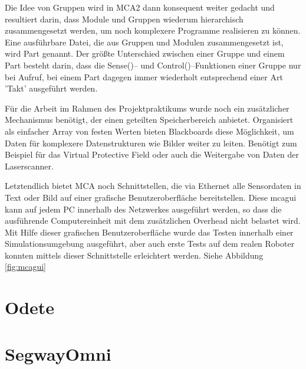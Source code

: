 Die Idee von Gruppen wird in MCA2 dann konsequent weiter gedacht und resultiert darin,
 dass Module und Gruppen wiederum hierarchisch zusammengesetzt werden, um noch komplexere Programme realisieren zu können.
 Eine ausführbare Datei, die aus Gruppen und Modulen zusammengesetzt ist, wird Part genannt.
 Der größte Unterschied zwischen einer Gruppe und einem Part besteht darin, dass die Sense()-- und Control()--Funktionen einer Gruppe nur bei Aufruf,
 bei einem Part dagegen immer wiederholt entsprechend einer Art 'Takt' ausgeführt werden.

Für die Arbeit im Rahmen des Projektpraktikums wurde noch ein zusätzlicher Mechanismus benötigt,
 der einen geteilten Speicherbereich anbietet. Organisiert als einfacher Array von festen Werten bieten Blackboards diese Möglichkeit,
 um Daten für komplexere Datenstrukturen wie Bilder weiter zu leiten.
 Benötigt zum Beispiel für das Virtual Protective Field oder auch die Weitergabe von Daten der Laserscanner.

Letztendlich bietet MCA noch Schnittstellen, die via Ethernet alle Sensordaten in Text oder Bild auf einer grafische Benutzeroberfläche bereitstellen.
 Diese mcagui kann auf jedem PC innerhalb des Netzwerkes ausgeführt werden, so dass die ausführende Computereinheit
 mit dem zusätzlichen Overhead nicht belastet wird. Mit Hilfe dieser grafischen Benutzeroberfläche wurde das Testen
 innerhalb einer Simulationsumgebung ausgeführt, aber auch erste Tests auf dem realen Roboter konnten mittels dieser Schnittstelle erleichtert werden.
 Siehe Abbildung \ref{fig:mcagui} \citep{mca}


\section{Odete}
\authorsection{\editordirk}


\section{SegwayOmni}
\authorsection{\editordirk}

